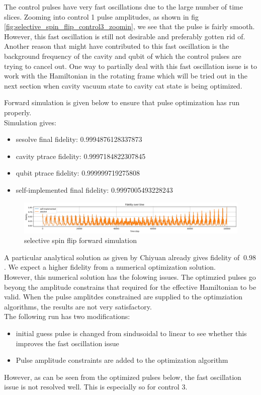 \documentclass[12pt]{article}
\begin{document}
The control pulses have very fast oscillations due to the large number of time slices.
Zooming into control 1 pulse amplitudes, as shown in fig \ref{fig:selective_spin_flip_control3_zoomin},
we see that the pulse is fairly smooth. However, this fast oscillation is still not desirable and preferably gotten rid of. 
Another reason that might have contributed to this fast oscillation is the background frequency of the cavity and qubit 
of which the control pulses are trying to cancel out. One way to partially deal with this fast oscillation issue is to work
with the Hamiltonian in the rotating frame which will be tried out in the next section when cavity vacuum state to cavity cat state
is being optimized.  

Forward simulation is given below to ensure that pulse optimization has run properly. 
\\
Simulation gives: 
\begin{itemize}
    \item sesolve final fidelity:  0.9994876128337873
    \item cavity ptrace fidelity:  0.9997184822307845
    \item qubit ptrace fidelity:  0.999999719275808
    \item self-implemented final fidelity:  0.9997005493228243
\end{itemize}
\begin{figure}[H]
    \centering
    \includegraphics[width=0.95\linewidth]{selective_spin_flip_GRAPE_simulation.png}
    \caption{selective spin flip forward simulation}
    \label{fig:selective_spin_flip_forward_simulation}
\end{figure}


A particular analytical solution as given by Chiyuan already gives fidelity of $~0.98$.
            We expect a higher fidelity from a numerical optimization solution. 
\\
However, this numerical solution has the folowing issues.
The optimzied pulses go beyong the amplitude constrains that required for the effective Hamiltonian to be valid. 
When the pulse amplitdes constrained are supplied to the optimziation algorithms, the results are not very satisfactory. 
\\
The following run has two modifications: 
\begin{itemize}
    \item initial guess pulse is changed from sindusoidal to linear to see whether this improves the fast oscillation issue
    \item Pulse amplitude constraints are added to the optimization algorithm
\end{itemize}
However, as can be seen from the optimized pulses below, the fast oscillation issue is not resolved well. 
This is especially so for control 3.
\\
\end{document}
